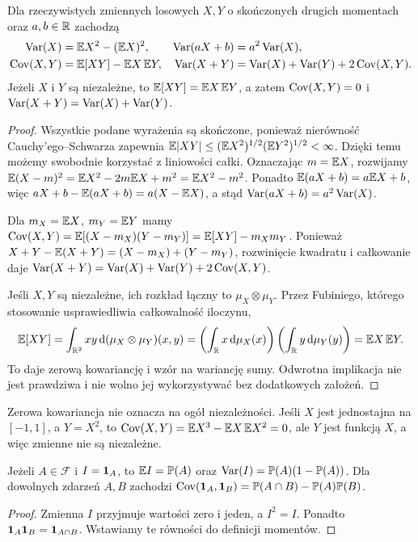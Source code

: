 \begin{stwierdzenie}
Dla rzeczywistych zmiennych losowych $X,Y$ o skończonych
drugich momentach oraz $a,b\in\mathbb{R}$ zachodzą
\begin{align*}
\operatorname{Var}(X)&=\mathbb{E} X^2-(\mathbb{E} X)^2, &
\operatorname{Var}(aX+b)&=a^2\operatorname{Var}(X),\\
\operatorname{Cov}(X,Y)&=\mathbb{E}[XY]-\mathbb{E} X\,\mathbb{E} Y, &
\operatorname{Var}(X+Y)&=\operatorname{Var}(X)+\operatorname{Var}(Y)+2\operatorname{Cov}(X,Y).
\end{align*}
Jeżeli $X$ i $Y$ są niezależne, to $\mathbb{E}[XY]=\mathbb{E} X\,\mathbb{E} Y$,
a zatem $\operatorname{Cov}(X,Y)=0$ i $\operatorname{Var}(X+Y)=\operatorname{Var}(X)+\operatorname{Var}(Y)$.
\end{stwierdzenie}
\begin{proof}
Wszystkie podane wyrażenia są skończone,
ponieważ nierówność Cauchy'ego--Schwarza zapewnia
$\mathbb{E}|XY|\leq(\mathbb{E} X^2)^{1/2}(\mathbb{E} Y^2)^{1/2}<\infty$.
Dzięki temu możemy swobodnie korzystać z liniowości całki.
Oznaczając $m=\mathbb{E} X$, rozwijamy
$\mathbb{E}(X-m)^2=\mathbb{E} X^2-2m\mathbb{E} X+m^2=\mathbb{E} X^2-m^2$.
Ponadto $\mathbb{E}(aX+b)=a\mathbb{E} X+b$, więc
$aX+b-\mathbb{E}(aX+b)=a(X-\mathbb{E} X)$,
a stąd $\operatorname{Var}(aX+b)=a^2\operatorname{Var}(X)$.

Dla $m_X=\mathbb{E} X$, $m_Y=\mathbb{E} Y$ mamy
$\operatorname{Cov}(X,Y)=\mathbb{E}[(X-m_X)(Y-m_Y)]
=\mathbb{E}[XY]-m_Xm_Y$.
Ponieważ
$X+Y-\mathbb{E}(X+Y)=(X-m_X)+(Y-m_Y)$,
rozwinięcie kwadratu i całkowanie daje
$\operatorname{Var}(X+Y)=\operatorname{Var}(X)+\operatorname{Var}(Y)+2\operatorname{Cov}(X,Y)$.

Jeśli $X,Y$ są niezależne, ich rozkład łączny to
$\mu_X\otimes\mu_Y$. Przez Fubiniego, którego
stosowanie usprawiedliwia całkowalność iloczynu,
\[
\mathbb{E}[XY]=\int_{\mathbb{R}^2}xy\,\mathrm{d}(\mu_X\otimes\mu_Y)(x,y)
=\left(\int_{\mathbb{R}} x\,\mathrm{d}\mu_X(x)\right)
 \left(\int_{\mathbb{R}} y\,\mathrm{d}\mu_Y(y)\right)
=\mathbb{E} X\,\mathbb{E} Y.
\]
To daje zerową kowariancję i wzór na wariancję sumy.
Odwrotna implikacja nie jest prawdziwa i nie wolno
jej wykorzystywać bez dodatkowych założeń.
\end{proof}

\begin{uwaga}
Zerowa kowariancja nie oznacza na ogół niezależności.
Jeśli $X$ jest jednostajna na $[-1,1]$, a $Y=X^2$, to
$\operatorname{Cov}(X,Y)=\mathbb{E} X^3-\mathbb{E} X\,\mathbb{E} X^2=0$,
ale $Y$ jest funkcją $X$, a więc zmienne nie są niezależne.
\end{uwaga}

\begin{stwierdzenie}
Jeżeli $A\in\mathcal F$ i $I=\mathbf{1}_{A}$, to
$\mathbb{E} I=\mathbb{P}(A)$ oraz
$\operatorname{Var}(I)=\mathbb{P}(A)(1-\mathbb{P}(A))$.
Dla dowolnych zdarzeń $A,B$ zachodzi
$\operatorname{Cov}(\mathbf{1}_{A},\mathbf{1}_{B})=\mathbb{P}(A\cap B)-\mathbb{P}(A)\mathbb{P}(B)$.
\end{stwierdzenie}
\begin{proof}
Zmienna $I$ przyjmuje wartości zero i jeden, a $I^2=I$.
Ponadto $\mathbf{1}_{A}\mathbf{1}_{B}=\mathbf{1}_{A\cap B}$.
Wstawiamy te równości do definicji momentów.
\end{proof}

